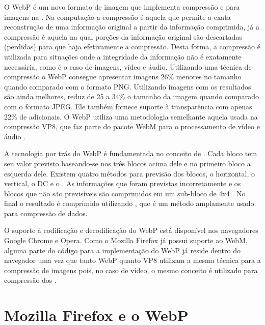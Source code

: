 \documentclass[espaco=simples,appendix=Name]{abnt}
\begin{document}
O WebP é um novo formato de imagem que implementa compressão  e  para imagens na . Na computação a compressão  é aquela que permite a exata reconstrução de uma informação original a partir da informação comprimida, já a compressão  é aquela na qual porções da informação original são descartadas (perdidas) para que haja efetivamente a compressão. Desta forma, a compressão  é utilizada para situações onde a integridade da informação não é exatamente necessária, como é o caso de imagens, vídeo e áudio. Utilizando uma técnica de compressão  o WebP consegue apresentar imagens 26\% menores no tamanho quando comparado com o formato PNG. Utilizando imagens com  os resultados são ainda melhores, reduz de 25 a 34\% o tamanho da imagem quando comparado com o formato JPEG. Ele também fornece suporte à transparência com apenas 22\% de  adicionais. O WebP utiliza uma metodologia semelhante aquela usada na compressão VP8, que faz parte do pacote WebM para o processamento de vídeo e áudio \cite{WebPLossyStudy}.

A tecnologia por trás do WebP é fundamentada no conceito de . Cada bloco tem seu valor previsto baseando-se nos três blocos acima dele e no primeiro bloco a esquerda dele. Existem quatro métodos para previsão dos blocos, o horizontal, o vertical, o DC e o . As informações que foram previstas incorretamente e os blocos que não são previsíveis são comprimidos em um sub-bloco de 4x4 . No final o resultado é comprimido utilizando , que é um método  amplamente usado para compressão de dados.

O suporte à codificação e decodificação do WebP está disponível nos navegadores Google Chrome e Opera. Como o Mozilla Firefox já possui suporte ao WebM, alguma parte do código para a implementação do WebP já reside dentro do navegador uma vez que tanto WebP quanto VP8 utilizam a mesma técnica para a compressão de imagens pois, no caso de vídeo, o mesmo conceito é utilizado para compressão dos .

\section{Mozilla Firefox e o WebP}
\end{document}
